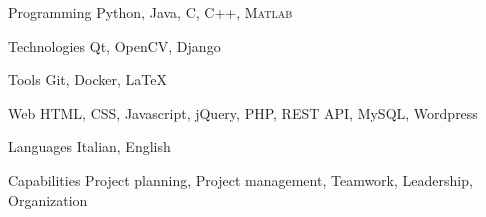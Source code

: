 
\begin{cvskills}

  \cvskill
    {Programming}
    {Python, Java, C, C++, \textsc{Matlab}}

  \cvskill
    {Technologies}
    {Qt, OpenCV, Django}

  \cvskill
    {Tools}
    {Git, Docker, \LaTeX}

  \cvskill
    {Web}
    {HTML, CSS, Javascript, jQuery, PHP, REST API, MySQL, Wordpress}

\end{cvskills}

\begin{cvskills}
  \hspace{4.0mm}

  \cvskill
    {Languages}
    {Italian, English}
  
  \cvskill
    {Capabilities}
    {Project planning, Project management, Teamwork, Leadership, Organization}

\end{cvskills}
